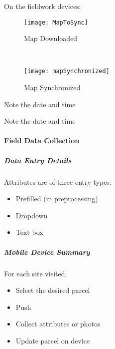   On the fieldwork devices:
 \begin{wrapfigure}{r}{0.6\textwidth}
 \centering
     \texttt{[image: MapToSync]}
 \vspace{-.2in}
 
 \caption{Map Downloaded}
 \vspace{.05in}

 \HRule \\[.4cm] %
 \vspace{.05in}

     \texttt{[image: mapSynchronized]}
 \vspace{-.2in}

 \caption{Map Synchronized}
 \end{wrapfigure}
 \vspace{.5in}
 
{\smallbtn Note the date and time}
 \vspace{.5in}

{\bigbtn{}  \lookArrow}

 \vspace{4in}

 {\smallbtn Note the date and time}
 \vspace{1in}


 \clearpage

 \paragraph{Field Data Collection}
 
 \subparagraph{Data Entry Details}

 Attributes are of three entry types:
 \begin{itemize}
 \item Prefilled {\scriptsize (in preprocessing)}
 \item Dropdown
 \item Text box
 \end{itemize}
 \vspace{1in}

 \subparagraph{Mobile Device Summary}

 For each site visited,

 \begin{itemize}
 \item Select the desired parcel
 \item Push 
 \item Collect attributes or photos
 \item Update parcel on device
 \end{itemize}

